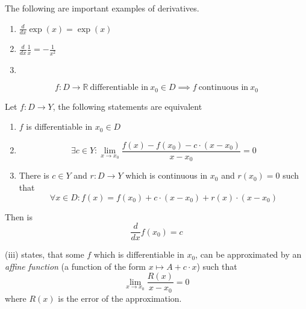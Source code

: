 \begin{proposition}
   The following are important examples of derivatives.
   \begin{enumerate}[label=\roman*, align=Center]
      \item \(\frac{d}{dx} \exp(x) = \exp(x)\)
      \item \(\frac{d}{dx} \frac{1}{x} = -\frac{1}{x^2}\)
      \item 
   \end{enumerate}
\end{proposition}

\begin{proposition}\label{pro:deri_impl_cont}
   \[f: D \to \mathbb{R}~\text{differentiable in}~x_0 \in D \implies f~\text{continuous in}~x_0\]
\end{proposition}

\begin{proposition}
   Let \(f: D \to Y\), the following statements are equivalent
   \begin{enumerate}[label=\roman*, align=Center]
      \item \(f\) is differentiable in \(x_0 \in D\)
      \item
         \[\exists c \in Y: \lim_{x \to x_0} \frac{f(x) - f(x_0) - c \cdot (x - x_0)}{x - x_0} = 0\]
      \item There is \(c \in Y\) and \(r: D \to Y\) which is continuous in \(x_0\) and \(r(x_0) = 0\) such that
         \[\forall x \in D: f(x) = f(x_0) + c \cdot (x - x_0) + r(x) \cdot (x - x_0)\]
   \end{enumerate}
   Then is
   \[\frac{d}{dx}f(x_0) = c\]
\end{proposition}
\begin{remark}[Intuition]
   (iii) states, that some \(f\) which is differentiable in \(x_0\), can be approximated by an \emph{affine function} (a function of the form \(x \mapsto A + c \cdot x\)) such that
   \[\lim_{x \to x_0} \frac{R(x)}{x - x_0} = 0\]
   where \(R(x)\) is the error of the approximation.
\end{remark}
